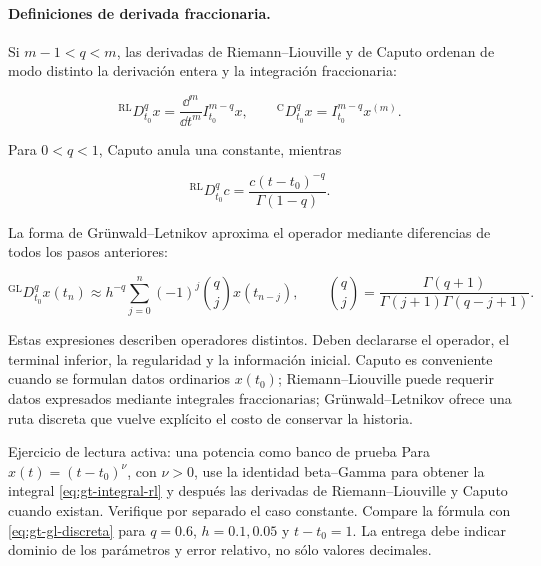 \paragraph{Definiciones de derivada fraccionaria.}
Si $m-1<q<m$, las derivadas de Riemann--Liouville y de Caputo ordenan de modo
distinto la derivación entera y la integración fraccionaria:

\begin{equation}
 {}^{\mathrm{RL}}D_{t_0}^{q}x
 =\frac{\dd^m}{\dd t^m}I_{t_0}^{m-q}x,
 \qquad
 {}^{\mathrm C}D_{t_0}^{q}x
 =I_{t_0}^{m-q}x^{(m)}.
 \label{eq:gt-rl-caputo}
\end{equation}

Para $0<q<1$, Caputo anula una constante, mientras

\begin{equation}
 {}^{\mathrm{RL}}D_{t_0}^{q}c
 =\frac{c(t-t_0)^{-q}}{\Gamma(1-q)}.
 \label{eq:gt-rl-constante}
\end{equation}

La forma de Grünwald--Letnikov aproxima el operador mediante diferencias de todos los
pasos anteriores:

\begin{equation}
 {}^{\mathrm{GL}}D_{t_0}^{q}x(t_n)
 \approx h^{-q}\sum_{j=0}^{n}(-1)^j
 \binom{q}{j}x(t_{n-j}),
 \qquad
 \binom{q}{j}=\frac{\Gamma(q+1)}{\Gamma(j+1)\Gamma(q-j+1)}.
 \label{eq:gt-gl-discreta}
\end{equation}

Estas expresiones describen operadores distintos. Deben declararse el
operador, el terminal inferior, la regularidad y la información inicial. Caputo es
conveniente cuando se formulan datos ordinarios $x(t_0)$; Riemann--Liouville puede
requerir datos expresados mediante integrales fraccionarias; Grünwald--Letnikov ofrece
una ruta discreta que vuelve explícito el costo de conservar la historia.

\begin{activitybox}{Ejercicio de lectura activa: una potencia como banco de prueba}
Para $x(t)=(t-t_0)^\nu$, con $\nu>0$, use la identidad beta--Gamma para obtener
la integral \eqref{eq:gt-integral-rl} y después las derivadas de
Riemann--Liouville y Caputo cuando existan. Verifique por separado el caso constante.
Compare la fórmula con \eqref{eq:gt-gl-discreta} para $q=0.6$, $h=0.1,0.05$ y
$t-t_0=1$. La entrega debe indicar dominio de los parámetros y error relativo, no
sólo valores decimales.
\end{activitybox}

